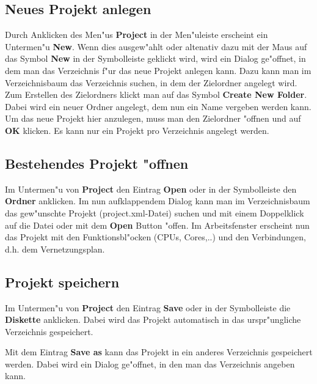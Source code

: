 \documentclass[a4paper,titlepage,12pt,ngerman]{scrbook}
\begin{document}
\subsection{Neues Projekt anlegen}
Durch Anklicken des Men"us {\bf Project} in der Men"uleiste erscheint ein Untermen"u {\bf New}. Wenn dies ausgew"ahlt oder altenativ dazu mit der Maus auf das Symbol {\bf New} in der Symbolleiste geklickt wird, wird ein Dialog ge"offnet, in dem man das Verzeichnis f"ur das neue Projekt anlegen kann. Dazu kann man im Verzeichnisbaum das Verzeichnis suchen, in dem der Zielordner angelegt wird. Zum Erstellen des Zielordners klickt man auf das Symbol {\bf Create New Folder}. Dabei wird ein neuer Ordner angelegt, dem nun ein Name vergeben werden kann. Um das neue Projekt hier anzulegen, muss man den Zielordner "offnen und auf {\bf OK} klicken.\newline
Es kann nur ein Projekt pro Verzeichnis angelegt werden.


\subsection{Bestehendes Projekt "offnen}
Im Untermen"u von {\bf Project} den Eintrag {\bf Open} oder in der Symbolleiste den {\bf Ordner} anklicken. Im nun aufklappendem Dialog kann man im Verzeichnisbaum das gew"unschte Projekt (project.xml-Datei) suchen und mit einem Doppelklick auf die Datei oder mit dem {\bf Open} Button "offen.
Im Arbeitsfenster erscheint nun das Projekt mit den Funktionsbl"ocken (CPUs, Cores,..) und den Verbindungen, d.h. dem Vernetzungsplan.\par


\subsection{Projekt speichern}
Im Untermen"u von {\bf Project} den Eintrag {\bf Save} oder in der Symbolleiste die {\bf Diskette} anklicken. Dabei wird das Projekt automatisch in das urspr"ungliche Verzeichnis gespeichert.\par
Mit dem Eintrag {\bf Save as} kann das Projekt in ein anderes Verzeichnis gespeichert werden. Dabei wird ein Dialog ge"offnet, in den man das Verzeichnis angeben kann.\par


\end{document}
